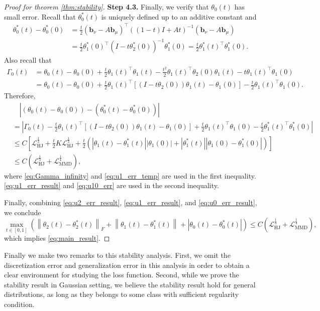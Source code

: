 \documentclass{article} %
\theoremstyle{plain}
\theoremstyle{definition}
\theoremstyle{remark}
\newcommand{\norm}[2][H^s]{\left\|#2\right\|_{#1}}
\newcommand{\bb}{\mathbf{b}}
\newcommand{\LMMD}{\mathcal{L}_{\text{MMD}}}
\newcommand{\LHJ}{\mathcal{L}_{\text{HJ}}}
\newcommand{\Gl}{\Gamma_0}
\newcommand{\tp}{^{\top}}
\newcommand{\parentheses}[1]{\left(#1\right)}
\newcommand{\sqbra}[1]{\left[#1\right]}
\newcommand{\abs}[1]{\left|#1\right|}
\begin{document}
\begin{proof}[Proof for theorem \ref{thm:stability}]
\medskip
\textbf{Step 4.3.} Finally, we verify that $\theta_0(t)$ has small error. Recall that $\theta_0^*(t)$ is uniquely defined up to an additive constant and
\begin{align*}
\theta_0^*(t) - \theta_0^*(0) &= \frac{t}{2} (\bb_\nu-A\bb_\mu)\tp \parentheses{(1-t)I + At}^{-1} (\bb_\nu-A\bb_\mu) \\
&= \frac{t}{2} \theta_1^*(0)\tp \parentheses{I - t \theta_2^*(0)}^{-1} \theta_1^*(0) = \frac{t}{2} \theta_1^*(t)\tp \theta_1^*(0).
\end{align*}
Also recall that
\begin{align*}
\Gl(t) &= \theta_0(t) - \theta_0(0) + \frac{t}{2} \theta_1(t)\tp \theta_1(t) - \frac{t^2}{2} \theta_1(t)\tp \theta_2(0) \theta_1(t) - t \theta_1(t)\tp \theta_1(0) \\
& = \theta_0(t) - \theta_0(0) + \frac{t}{2} \theta_1(t)\tp \sqbra{(I-t \theta_2(0))\theta_1(t) - \theta_1(0)} - \frac{t}{2} \theta_1(t)\tp \theta_1(0).
\end{align*}
Therefore,
\begin{equation}\label{eq:u0_err_result}
\begin{aligned}
& \quad \abs{(\theta_0(t)-\theta_0(0)) - (\theta_0^*(t) - \theta_0^*(0))} \\
& = \abs{\Gl(t) - \frac{t}{2} \theta_1(t)\tp \sqbra{(I-t \theta_2(0))\theta_1(t) - \theta_1(0)} + \frac{t}{2} \theta_1(t)\tp \theta_1(0) - \frac{t}{2} \theta_1^*(t)\tp \theta_1^*(0)} \\
& \le C \sqbra{\LHJ^{\frac13} + \frac{t}{2} K \LHJ^{\frac13} + \frac{t}{2} \parentheses{\abs{\theta_1(t)-\theta_1^*(t)} \abs{\theta_1(0)} +\abs{\theta_1^*(t)} \abs{\theta_1(0)-\theta_1^*(0)}}} \\
& \le C \parentheses{\LHJ^{\frac13} + \LMMD^{\frac14}},
\end{aligned}
\end{equation}
where \eqref{eq:Gamma_infinity} and \eqref{eq:u1_err_temp} are used in the first inequality. \eqref{eq:u1_err_result} and \eqref{eq:u10_err} are used in the second inequality.

Finally, combining \eqref{eq:u2_err_result}, \eqref{eq:u1_err_result}, and \eqref{eq:u0_err_result}, we conclude
$$\max_{t \in [0,1]} \parentheses{ \norm[F]{\theta_2(t) - \theta_2^*(t)} + \norm[]{\theta_1(t)-\theta_1^*(t)} + \abs{\theta_0(t) - \theta_0^*(t)}} \le C \parentheses{\LHJ^{\frac13} + \LMMD^{\frac14}},$$
which implies \eqref{eq:main_result}.
\end{proof}
Finally we make two remarks to this stability analysis. First, we omit the discretization error and generalization error in this analysis in order to obtain a clear environment for studying the loss function. Second, while we prove the stability result in Gaussian setting, we believe the stability result hold for general distributions, as long as they belongs to some class with sufficient regularity condition.
\end{document}
